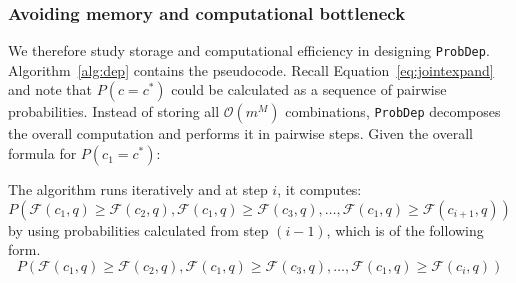 
 
\subsubsection{Avoiding memory and computational bottleneck}
We therefore study storage and computational efficiency in designing {\tt ProbDep}. Algorithm~\ref{alg:dep} contains the pseudocode. Recall Equation~\ref{eq:jointexpand} and note that $P(c = c^*)$ could be calculated as a sequence of pairwise probabilities. Instead of storing all $\mathcal{O}(m^M)$ combinations, {\tt ProbDep} decomposes the overall computation and performs it in pairwise steps. Given the overall formula for $P(c_1 = c^*)$:


The algorithm runs iteratively and at step $i$, it computes: \[
P(\mathcal{F}(c_1, q) \geq \mathcal{F}(c_2, q), \mathcal{F}(c_1, q) \geq \mathcal{F}(c_3, q), \dots, \mathcal{F}(c_1, q) \geq \mathcal{F}(c_{i+1}, q))
\] by using probabilities calculated from step $(i - 1)$, which is of the following form.
\[P(\mathcal{F}(c_1, q) \geq \mathcal{F}(c_2, q), \mathcal{F}(c_1, q) \geq \mathcal{F}(c_3, q), \dots, \mathcal{F}(c_1, q) \geq \mathcal{F}(c_{i}, q))\]








\begin{comment}
    At each step \(i\), we only keep track of the scoring assignments from the previous step that satisfied:

\[
[f(c_1) > f(c_2), f(c_1) > f(c_3), \dots, f(c_1) > f(c_{i-1})]
\]

and use this information to compute:

\[
P(f(c_1) > f(c_2), f(c_1) > f(c_3), \dots, f(c_1) > f(c_i)).
\]
\end{comment}



